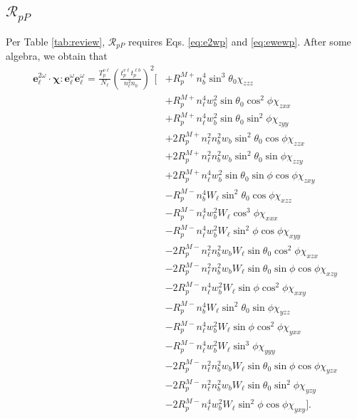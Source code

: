 \documentclass{article}
\begin{document}
\subsection{\texorpdfstring{$\mathcal{R}_{pP}$}{RpP}}\label{sec:RpP}

Per Table \ref{tab:review}, $\mathcal{R}_{pP}$ requires Eqs. \eqref{eq:e2wp}
and \eqref{eq:ewewp}. After some algebra, we obtain that
\begin{equation*}
\begin{split}
\mathbf{e}^{2\omega}_{\ell}\cdot\boldsymbol{\chi}:
\mathbf{e}^{\omega}_{\ell}\mathbf{e}^{\omega}_{\ell} =
\frac{T^{v\ell}_{p}}{N_{\ell}}
\left(\frac{t^{v\ell}_{p}t^{\ell b}_{p}}
{n^{2}_{\ell}n_{b}}\right)^{2}
\big[
&+ R^{M+}_{p}n^{4}_{b}\sin^{3}\theta_{0}
   \chi_{zzz}\\
&+ R^{M+}_{p}n^{4}_{\ell}w^{2}_{b}\sin\theta_{0}\cos^{2}\phi
   \chi_{zxx}\\
&+ R^{M+}_{p}n^{4}_{\ell}w^{2}_{b}\sin\theta_{0}\sin^{2}\phi
   \chi_{zyy}\\
&+ 2R^{M+}_{p}n^{2}_{\ell}n^{2}_{b}w_{b}\sin^{2}\theta_{0}\cos\phi
   \chi_{zzx}\\
&+ 2R^{M+}_{p}n^{2}_{\ell}n^{2}_{b}w_{b}\sin^{2}\theta_{0}\sin\phi
   \chi_{zzy}\\
&+ 2R^{M+}_{p}n^{4}_{\ell}w^{2}_{b}\sin\theta_{0}\sin\phi\cos\phi
   \chi_{zxy}\\
&- R^{M-}_{p}n^{4}_{b}W_{\ell}\sin^{2}\theta_{0}\cos\phi
   \chi_{xzz}\\
&- R^{M-}_{p}n^{4}_{\ell}w^{2}_{b}W_{\ell}\cos^{3}\phi
   \chi_{xxx}\\
&- R^{M-}_{p}n^{4}_{\ell}w^{2}_{b}W_{\ell}\sin^{2}\phi\cos\phi
   \chi_{xyy}\\
&- 2R^{M-}_{p}n^{2}_{\ell}n^{2}_{b}w_{b}W_{\ell}\sin\theta_{0}\cos^{2}\phi
   \chi_{xzx}\\
&- 2R^{M-}_{p}n^{2}_{\ell}n^{2}_{b}w_{b}W_{\ell}\sin\theta_{0}\sin\phi\cos\phi
   \chi_{xzy}\\
&- 2R^{M-}_{p}n^{4}_{\ell}w^{2}_{b}W_{\ell}\sin\phi\cos^{2}\phi
   \chi_{xxy}\\
&- R^{M-}_{p}n^{4}_{b}W_{\ell}\sin^{2}\theta_{0}\sin\phi
   \chi_{yzz}\\
&- R^{M-}_{p}n^{4}_{\ell}w^{2}_{b}W_{\ell}\sin\phi\cos^{2}\phi
   \chi_{yxx}\\
&- R^{M-}_{p}n^{4}_{\ell}w^{2}_{b}W_{\ell}\sin^{3}\phi
   \chi_{yyy}\\
&- 2R^{M-}_{p}n^{2}_{\ell}n^{2}_{b}w_{b}W_{\ell}\sin\theta_{0}\sin\phi\cos\phi
   \chi_{yzx}\\
&- 2R^{M-}_{p}n^{2}_{\ell}n^{2}_{b}w_{b}W_{\ell}\sin\theta_{0}\sin^{2}\phi
   \chi_{yzy}\\
&- 2R^{M-}_{p}n^{4}_{\ell}w^{2}_{b}W_{\ell}\sin^{2}\phi\cos\phi
   \chi_{yxy}
\big].
\end{split}
\end{equation*}
\end{document}
